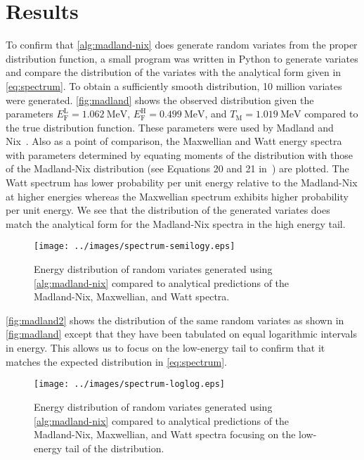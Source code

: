 \documentclass[final,leqno,onefignum,onetabnum]{siamltex1213}
\newcommand{\tmax}{T_{\mathrm{M}}}
\newcommand{\efl}{E_{\mathrm{F}}^{\mathrm{L}}}
\newcommand{\efh}{E_{\mathrm{F}}^{\mathrm{H}}}
\begin{document}
\section{Results}

To confirm that \autoref{alg:madland-nix} does generate random variates from the
proper distribution function, a small program was written in Python to generate
variates and compare the distribution of the variates with the analytical form
given in \eqref{eq:spectrum}. To obtain a sufficiently smooth distribution, 10
million variates were generated. \autoref{fig:madland} shows the observed
distribution given the parameters $\efl = \SI{1.062}{\mega\electronvolt}$, $\efh
= \SI{0.499}{\mega\electronvolt}$, and $\tmax = \SI{1.019}{\mega\electronvolt}$
compared to the true distribution function. These parameters were used by
Madland and Nix~\cite{nse-madland-1982}. Also as a point of comparison, the
Maxwellian and Watt energy spectra with parameters determined by equating
moments of the distribution with those of the Madland-Nix distribution (see
Equations 20 and 21 in~\cite{nse-madland-1982}) are plotted. The Watt spectrum
has lower probability per unit energy relative to the Madland-Nix at higher
energies whereas the Maxwellian spectrum exhibits higher probability per unit
energy. We see that the distribution of the generated variates does match the
analytical form for the Madland-Nix spectra in the high energy tail.
\begin{figure}[htbp]
  \centering \texttt{[image: ../images/spectrum-semilogy.eps]}
  \caption{Energy distribution of random variates generated using
    \autoref{alg:madland-nix} compared to analytical predictions of the
    Madland-Nix, Maxwellian, and Watt spectra.}
  \label{fig:madland}
\end{figure}

\autoref{fig:madland2} shows the distribution of the same random variates as
shown in \autoref{fig:madland} except that they have been tabulated on equal
logarithmic intervals in energy. This allows us to focus on the low-energy tail
to confirm that it matches the expected distribution in \eqref{eq:spectrum}.
\begin{figure}[htbp]
  \centering
  \texttt{[image: ../images/spectrum-loglog.eps]}
  \caption{Energy distribution of random variates generated using
    \autoref{alg:madland-nix} compared to analytical predictions of the
    Madland-Nix, Maxwellian, and Watt spectra focusing on the low-energy tail of
    the distribution.}
  \label{fig:madland2}
\end{figure}
\end{document}
